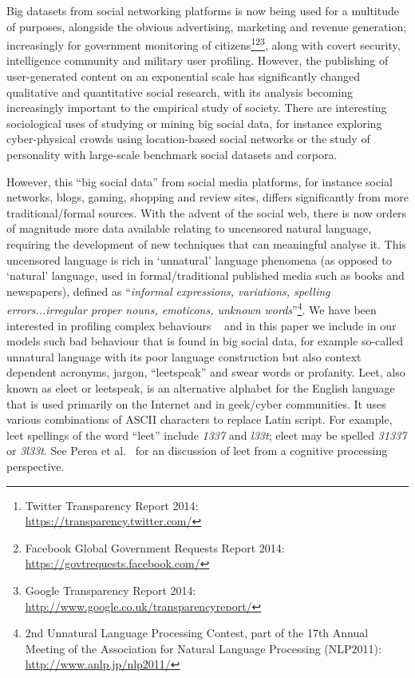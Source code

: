 \documentclass{AISB2008}
\begin{document}
Big datasets from social networking platforms is now being used for a
multitude of purposes, alongside the obvious advertising, marketing
and revenue generation; increasingly for government monitoring of
citizens\footnote{Twitter Transparency Report 2014:\\
\url{https://transparency.twitter.com/}}\footnote{Facebook Global
Government Requests Report
2014:\\\url{https://govtrequests.facebook.com/}}\footnote{Google
Transparency Report
2014:\\\url{http://www.google.co.uk/transparencyreport/}}, along with
covert security, intelligence community and military user profiling.
However, the publishing of user-generated content on an exponential
scale has significantly changed qualitative and quantitative social
research, with its analysis becoming increasingly important to the
empirical study of society. There are interesting sociological uses of
studying or mining big social data, for instance exploring
cyber-physical crowds using location-based social networks or the
study of personality with large-scale benchmark social datasets and
corpora.

However, this ``big social data'' from social media platforms, for
instance social networks, blogs, gaming, shopping and review sites,
differs significantly from more traditional/formal sources.  With the
advent of the social web, there is now orders of magnitude more data
available relating to uncensored natural language, requiring the
development of new techniques that can meaningful analyse it. This
uncensored language is rich in `unnatural' language phenomena (as
opposed to `natural' language, used in formal/traditional published
media such as books and newspapers), defined as ``{\emph{informal
expressions, variations, spelling errors...irregular proper nouns,
emoticons, unknown words}}''\footnote{2nd Unnatural Language
Processing Contest, part of the 17th Annual Meeting of the Association
for Natural Language Processing (NLP2011):
\url{http://www.anlp.jp/nlp2011/}}.  We have been interested in
profiling complex behaviours ~\cite{oatley+crick:2014} and in this
paper we include in our models such bad behaviour that is found in big
social data, for example so-called unnatural language with its poor
language construction but also context dependent acronyms, jargon,
``leetspeak'' and swear words or profanity.  Leet, also known as eleet
or leetspeak, is an alternative alphabet for the English language that
is used primarily on the Internet and in geek/cyber communities. It
uses various combinations of ASCII characters to replace Latin
script. For example, leet spellings of the word ``leet'' include
{\emph{1337}} and {\emph{l33t}}; eleet may be spelled {\emph{31337}}
or {\emph{3l33t}}. See Perea et al.~\cite{perea-et-al:2008} for an
discussion of leet from a cognitive processing perspective.
\end{document}
